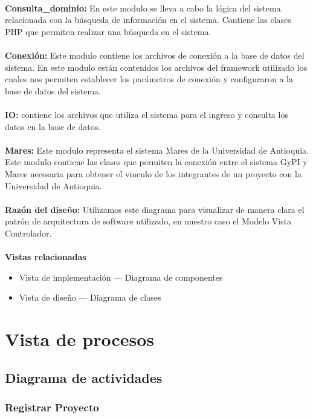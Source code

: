\documentclass[12pt,oneside,letterpaper]{report}
\begin{document}
\\
\textbf{Consulta\_dominio:} En este modulo se lleva a cabo la lógica del sistema relacionada con la búsqueda de información en el sistema. Contiene las clases PHP que permiten realizar una búsqueda en el sistema.\\
\\
\textbf{Conexión:} Este modulo contiene los archivos de conexión a la base de datos del sistema. En este modulo están contenidos los archivos del framework utilizado los cuales nos permiten establecer los parámetros de conexión y configuraron a la base de datos del sistema.\\
\\
\textbf{IO:} contiene los archivos que utiliza el sistema para el ingreso y consulta los datos en la base de datos.\\
\\
\textbf{Mares:} Este modulo representa el sistema Mares de la Universidad de Antioquia. Este modulo contiene las clases que permiten la conexión entre el sistema GyPI y Mares necesaria para obtener el vinculo de los integrantes de un proyecto con la Universidad de Antioquia.\\
\\

\textbf{Razón del diseño:}
Utilizamos este diagrama para visualizar de manera clara el patrón de arquitectura de software utilizado, en nuestro caso el Modelo Vista Controlador.\\
\\

\textbf{Vistas relacionadas}
\begin{itemize}
\item Vista de implementación --- Diagrama de componentes
\item Vista de diseño --- Diagrama de clases
\end{itemize}


\section{Vista de procesos}

\subsection{Diagrama de actividades}


\subsubsection{Registrar Proyecto}
\end{document}
